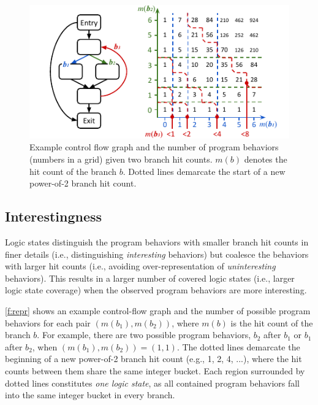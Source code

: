 \documentclass[letterpaper,twocolumn,10pt]{article}
\begin{document}
\begin{figure}[t]
  \centering
  \includegraphics[width=\columnwidth]{images/repr.pdf}
  \caption{Example control flow graph and the number of program behaviors
  (numbers in a grid) given two branch hit counts. $m(b)$ denotes the hit count
  of the branch $b$. Dotted lines demarcate the start of a new power-of-2 branch
  hit count.}
  \label{f:repr}
\end{figure}

\subsection{Interestingness}
\label{s:prop:repr}

Logic states distinguish the program behaviors with smaller branch hit counts
in finer details (i.e., distinguishing \emph{interesting} behaviors) but
coalesce the behaviors with larger hit counts (i.e., avoiding
over-representation of \emph{uninteresting} behaviors). This results in a larger
number of covered logic states (i.e., larger logic state coverage) when the
observed program behaviors are more interesting.


\autoref{f:repr} shows an example control-flow graph and the number of possible
program behaviors for each pair $(m(b_1), m(b_2))$, where $m(b)$ is the hit
count of the branch $b$. For example, there are 
two possible program behaviors, $b_2$ after $b_1$ or $b_1$ after
$b_2$, when $(m(b_1), m(b_2))=(1, 1)$. 
%
The dotted lines demarcate the beginning of a new power-of-2 branch hit count
(e.g., 1, 2, 4, ...), where the hit counts between them share the same integer
bucket. Each region surrounded by dotted lines constitutes \emph{one logic
state}, as all contained program behaviors fall into the same integer bucket
in every branch.
\end{document}
